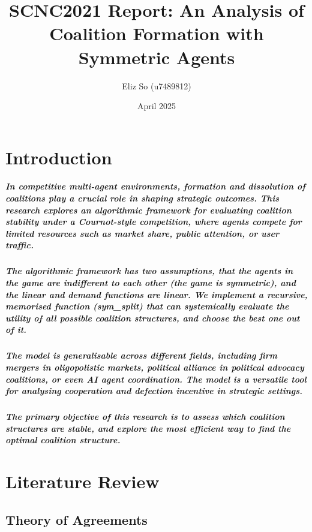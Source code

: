 \documentclass[11pt]{report}
\title{SCNC2021 Report: An Analysis of Coalition Formation with Symmetric Agents}
\author{Eliz So (u7489812)}
\date{April 2025}
\begin{document}
\maketitle

\chapter{Introduction}
\paragraph{In competitive multi-agent environments, formation and dissolution of coalitions play a crucial role in shaping strategic outcomes. This research explores an algorithmic framework for evaluating coalition stability under a Cournot-style competition, where agents compete for limited resources such as market share, public attention, or user traffic. }
\paragraph{The algorithmic framework has two assumptions, that the agents in the game are indifferent to each other (the game is symmetric), and the linear and demand functions are linear. We implement a recursive, memorised function (sym\_split) that can systemically evaluate the utility of all possible coalition structures, and choose the best one out of it. }
\paragraph{The model is generalisable across different fields, including firm mergers in oligopolistic markets, political alliance in political advocacy coalitions, or even AI agent coordination. The model is a versatile tool for analysing cooperation and defection incentive in strategic settings.}
\paragraph{The primary objective of this research is to assess which coalition structures are stable, and explore the most efficient way to find the optimal coalition structure. }
\chapter{Literature Review}

\section{Theory of Agreements}
\end{document}

